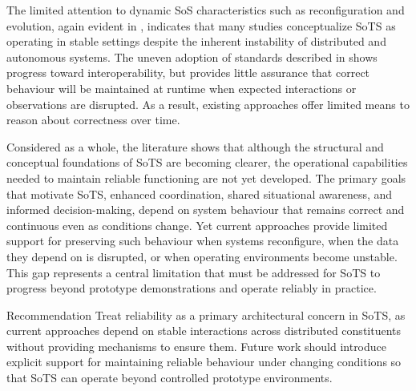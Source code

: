 The limited attention to dynamic SoS characteristics such as reconfiguration and evolution, again evident in , indicates that many studies conceptualize SoTS as operating in stable settings despite the inherent instability of distributed and autonomous systems. The uneven adoption of standards described in  shows progress toward interoperability, but provides little assurance that correct behaviour will be maintained at runtime when expected interactions or observations are disrupted. As a result, existing approaches offer limited means to reason about correctness over time.

Considered as a whole, the literature shows that although the structural and conceptual foundations of SoTS are becoming clearer, the operational capabilities needed to maintain reliable functioning are not yet developed. The primary goals that motivate SoTS, enhanced coordination, shared situational awareness, and informed decision-making, depend on system behaviour that remains correct and continuous even as conditions change. Yet current approaches provide limited support for preserving such behaviour when systems reconfigure, when the data they depend on is disrupted, or when operating environments become unstable. This gap represents a central limitation that must be addressed for SoTS to progress beyond prototype demonstrations and operate reliably in practice.

\begin{recoframe}{Recommendation}
Treat reliability as a primary architectural concern in SoTS, as current approaches depend on stable interactions across distributed constituents without providing mechanisms to ensure them. Future work should introduce explicit support for maintaining reliable behaviour under changing conditions so that SoTS can operate beyond controlled prototype environments.
\end{recoframe}



